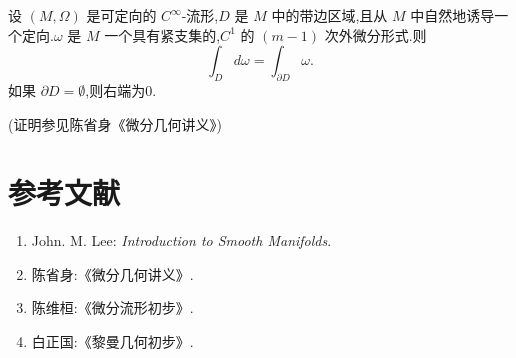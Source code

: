 \begin{theorem}[Stokes公式]
设 $(M, \Omega)$ 是可定向的 $C^\infty$-流形,$D$ 是 $M$ 中的带边区域,且从 $M$ 中自然地诱导一个定向.$\omega$ 是 $M$ 一个具有紧支集的,$C^1$ 的 $(m-1)$ 次外微分形式.则
\[
\int_D d\omega = \int_{\partial D} \omega.
\]
如果 $\partial D = \emptyset$,则右端为$0$.
\end{theorem}
(证明参见陈省身《微分几何讲义》)

\section*{参考文献}
\begin{enumerate}
    \item John. M. Lee: \textit{Introduction to Smooth Manifolds}.
    \item 陈省身:《微分几何讲义》.
    \item 陈维桓:《微分流形初步》.
    \item 白正国:《黎曼几何初步》.
\end{enumerate}